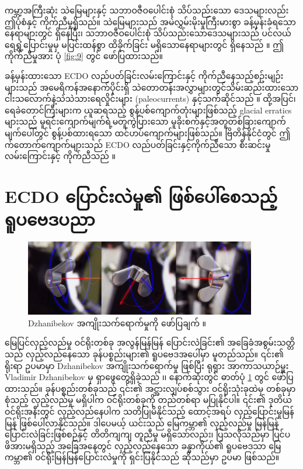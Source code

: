 \documentclass[10pt,twocolumn,letterpaper]{article}
\begin{document}
ကမ္ဘာ့အကြီးဆုံး သဲမြေများနှင့် သဘာဝဇီဝပေါင်းစုံ သိပ်သည်းသော ဒေသများလည်း ဤပုံစံနှင့် ကိုက်ညီမှုရှိသည်။ သဲမြေများသည် အမဲလွှမ်းမိုးမှုကြီးမားစွာ ခန့်မှန်းခံရသောနေရာများတွင် ရှိနေပြီး၊ သဘာဝဇီဝပေါင်းစုံ သိပ်သည်းသောဒေသများသည် ပင်လယ်ရေရွှံ့ပြောင်းမှုမှ မပြင်းထန်စွာ ထိခိုက်ခြင်း မရှိသောနေရာများတွင် ရှိနေသည် \cite{28}။ ဤကိုက်ညီမှုအား ပုံ \ref{fig:9} တွင် ဖော်ပြထားသည်။

ခန့်မှန်းထားသော ECDO လည်ပတ်ခြင်းလမ်းကြောင်းနှင့် ကိုက်ညီနေသည့်စဥ်းမျဉ်းများသည် အမေရိကန်အနောက်ပိုင်းရှိ သဲတောတန်းအလွှာများတွင်သိမ်းဆည်းထားသော ငါးသလောက်နဲ့သဲသဲသားရေလှိုင်းများ (paleocurrents) နှင့်သက်ဆိုင်သည် \cite{21}။ ထို့အပြင်၊ ရေခဲတောင်ကြီးများက ယူဆရသည့် စွန့်ပစ်ကျောက်တုံးများဖြစ်သည့် glacial erratics များသည် မူရင်းကျောက်မျက်ရဲ့မတူကွဲပြားသော မူခိုးစက်နှင့်အတူတစ်ခြားကျောက်မျက်ပေါ်တွင် စွန့်ပစ်ထားရသော ထင်ဟပ်ကျောက်များဖြစ်သည်။ ဗြိတိန်နိုင်ငံတွင် ဤက်တောက်ကျောက်များသည် ECDO လည်ပတ်ခြင်းနှင့်ကိုက်ညီသော စီးဆင်းမှုလမ်းကြောင်းနှင့် ကိုက်ညီသည် \cite{67,68}။

\section{ECDO ပြောင်းလဲမှု၏ ဖြစ်ပေါ်စေသည့် ရူပဗေဒပညာ}
\begin{figure}
\begin{center}
\includegraphics[width=0.9\textwidth]{dzhani.jpg}
\end{center}
   \caption{Dzhanibekov အကျိုးသက်ရောက်မှုကို ဖော်ပြချက် \cite{28}။}
\label{fig:10}
\end{figure}

မြေပြင်လှည့်လည်မှု ဝင်ရိုးတစ်ခု အလွန်မြန်မြန် ပြောင်းလဲခြင်း၏ အခြေခံအစွမ်းသတ္တိသည် လှည့်လည်နေသော ခုန်ပစ္စည်းများ၏ ရူပဗေဒအပေါ်မှာ မူတည်သည်။ ၎င်း၏ ရိုးရာ ဥပမာမှာ Dzhanibekov အကျိုးသက်ရောက်မှု ဖြစ်ပြီး ရုရှား အာကာသယာဉ်မှူး Vladimir Dzhanibekov မှ ရှာဖွေတွေ့ရှိခဲ့သည် \cite{37}၊၊ နောက်ဆုံးတွင် ဓာတ်ပုံ \ref{fig:10} တွင် ဖော်ပြထားသည်။ ခုန်ပစ္စည်းတစ်ခုသည် ၎င်း၏ အင္အားလျှပ်စစ်သွား ဝင်ရိုးသုံးခုထဲမှ တစ်ခုမှာ စုံသည့် လှည့်လည်မှု မရှိပါက ဝင်ရိုးတစ်ခုကို တည်တစ်ရာ မပြုနိုင်ပါ။ ၎င်း၏ ဒုတိယ ဝင်ရိုးအနီးတွင် လှည့်လည်နေပါက သတိပြုမိနိုင်သည့် ထောင့်အရပ် လှည့်ပြောင်းမှုမြန်မြန် ဖြစ်ပေါ်လာနိုင်သည်။ ဒါပေမယ့် ယင်းသည် မြေကမ္ဘာ၏ လှည့်လည်မှု မြန်မြန်ပြောင်းလဲခြင်းဖြစ်စဉ်နှင့် တိတိကျကျ တူညီမှု မရှိသော်လည်း၊ ပြသလိုသည်မှာ ပြင်ပ ဖိအားမရှိသည့် အခြေအနေတွင် လှည့်လည်နေသော ခန္ဓာကိုယ်၏ ရူပဗေဒသာ မြေကမ္ဘာ၏ ဝင်ရိုးမြန်မြန်ပြောင်းလဲမှုကို ရှင်းပြနိုင်သည် ဆိုသည်မှာ ဥပမာ ဖြစ်သည်။
\end{document}
